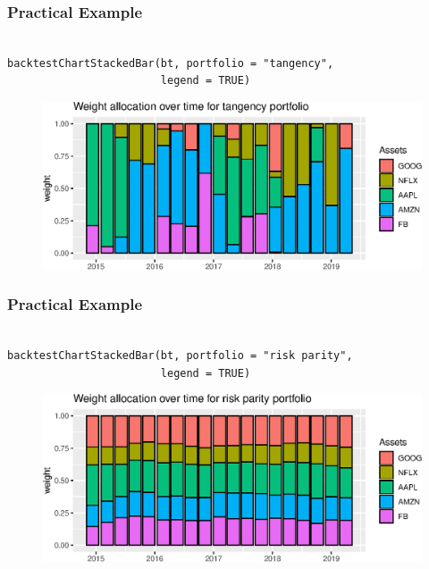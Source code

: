\documentclass[aspectratio=169]{beamer}
\begin{document}
\begin{frame}[fragile]
  \frametitle{Practical Example}
\begin{verbatim}

backtestChartStackedBar(bt, portfolio = "tangency",
                        legend = TRUE)
\end{verbatim}
\begin{figure}[!htb]
  \centering
  \includegraphics[scale=.7]{codes/weights-msr.eps}
\end{figure}
\end{frame}


\begin{frame}[fragile]
  \frametitle{Practical Example}
\begin{verbatim}

backtestChartStackedBar(bt, portfolio = "risk parity",
                        legend = TRUE)
\end{verbatim}
\begin{figure}[!htb]
  \centering
  \includegraphics[scale=.7]{codes/weights-rpp.eps}
\end{figure}
\end{frame}
\end{document}
